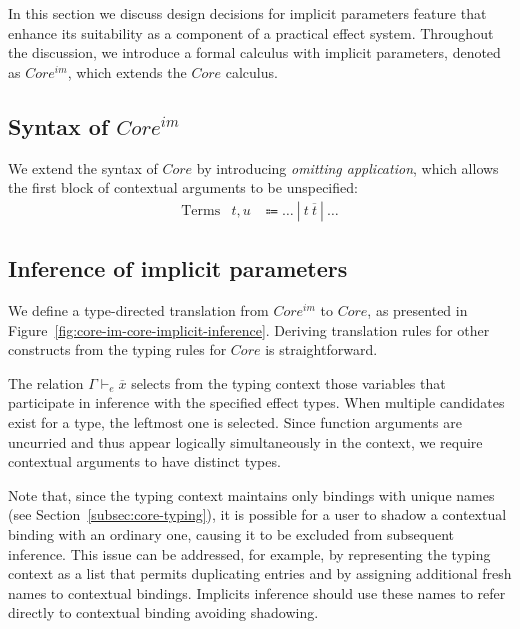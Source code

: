\documentclass[acmsmall,review,screen]{acmart}
\newcommand{\vor}{~|~}
\newcommand{\ap}{~}
\begin{document}
In this section we discuss design decisions for implicit parameters feature that enhance its suitability as a component of a practical effect system.
Throughout the discussion, we introduce a formal calculus with implicit parameters, denoted as $Core^{im}$, which extends the $Core$ calculus.

\subsection{Syntax of $Core^{im}$}

We extend the syntax of $Core$ by introducing \emph{omitting application}, which allows the first block of contextual arguments to be unspecified:
\[
    \begin{array}{lcc}
        \text{Terms} & t, u &\Coloneqq \ldots \vor t\ap\overline{t} \vor \ldots
    \end{array}
\]

\subsection{Inference of implicit parameters} \label{subsec:inference}

We define a type-directed translation from $Core^{im}$ to $Core$, as presented in Figure~\ref{fig:core-im-core-implicit-inference}.
Deriving translation rules for other constructs from the typing rules for $Core$ is straightforward.

The relation $\Gamma\vdash_e \overline{x}$ selects from the typing context those variables that participate in inference with the specified effect types.
When multiple candidates exist for a type, the leftmost one is selected.
Since function arguments are uncurried and thus appear logically simultaneously in the context, we require contextual arguments to have distinct types.

Note that, since the typing context maintains only bindings with unique names (see Section\ \ref{subsec:core-typing}), it is possible for a user to shadow a contextual binding with an ordinary one, causing it to be excluded from subsequent inference.
This issue can be addressed, for example, by representing the typing context as a list that permits duplicating entries and by assigning additional fresh names to contextual bindings.
Implicits inference should use these names to refer directly to contextual binding avoiding shadowing.
\end{document}

